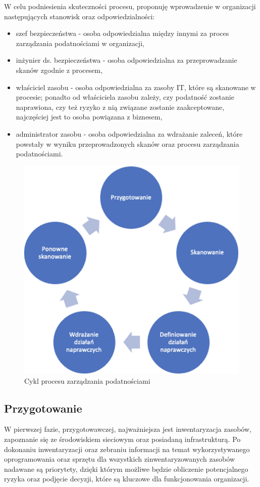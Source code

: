 \bigbreak
W celu podniesienia skuteczności procesu, \cite{Gartner-2020} proponuję wprowadzenie w organizacji następujących stanowisk oraz odpowiedzialności:
\begin{itemize}
    \item szef bezpieczeństwa - osoba odpowiedzialna między innymi za proces zarządzania podatnościami w organizacji,
    \item inżynier ds. bezpieczeństwa - osoba odpowiedzialna za przeprowadzanie skanów zgodnie z procesem,
    \item właściciel zasobu - osoba odpowiedzialna za zasoby IT, które są skanowane w procesie; ponadto od właściciela zasobu zależy, czy podatność zostanie naprawiona, czy też ryzyko z nią związane zostanie zaakceptowane, najczęściej jest to osoba powiązana z biznesem,
    \item administrator zasobu - osoba odpowiedzialna za wdrażanie zaleceń, które powstały w wyniku przeprowadzonych skanów oraz procesu zarządzania podatnościami.
\end{itemize}

\begin{figure}[!ht]
\centering
\includegraphics[width=.8\textwidth]{Chapters/Wstep/p-vm/cykl-vm.png}
\caption{Cykl procesu zarządzania podatnościami}
\label{fig:vm-cycle}
\end{figure}


\subsection{Przygotowanie}
W pierwszej fazie, przygotowawczej, najważniejsza jest inwentaryzacja zasobów, zapoznanie się ze środowiskiem sieciowym oraz posiadaną infrastrukturą. Po dokonaniu inwentaryzacji oraz zebraniu informacji na temat wykorzystywanego oprogramowania oraz sprzętu dla wszystkich zinwentaryzowanych zasobów nadawane są priorytety, dzięki którym możliwe będzie obliczenie potencjalnego ryzyka oraz podjęcie decyzji, które są kluczowe dla funkcjonowania organizacji.

